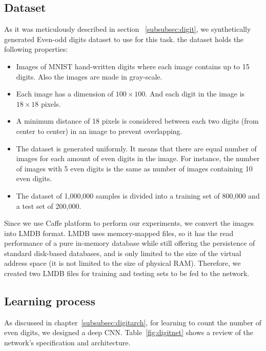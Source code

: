 \subsection{Dataset} 
As it was meticulously described in section ~\ref{subsubsec:digit}, we synthetically generated Even-odd digits dataset to use for this task. the dataset holds the following properties:
\begin{itemize}
\item Images of MNIST hand-written digits where each image contains up to 15 digits. Also the images are made in gray-scale.
\item Each image has a dimension of $100\times100$. And each digit in the image is $18\times18$ pixels.  
\item A minimum distance of 18 pixels is considered between each two digits (from center to center) in an image to prevent overlapping.
\item The dataset is generated uniformly. It means that there are equal number of images for each amount of even digits in the image. For instance, the number of images with 5 even digits is the same as number of images containing 10 even digits.
\item The dataset of 1,000,000 samples is divided into a training set of 800,000 and a test set of 200,000. 
\end{itemize}

Since we use Caffe platform to perform our experiments, we convert the images into LMDB format. LMDB uses memory-mapped files, so it has the read performance of a pure in-memory database while still offering the persistence of standard disk-based databases, and is only limited to the size of the virtual address space (it is not limited to the size of physical RAM). Therefore, we created two LMDB files for training and testing sets to be fed to the network.  

\subsection{Learning process}

As discussed in chapter~\ref{subsubsec:digitarch}, for learning to count the number of even digits, we designed a deep CNN. Table~\ref{fig:digitnet} shows a review of the network's specification and architecture.


